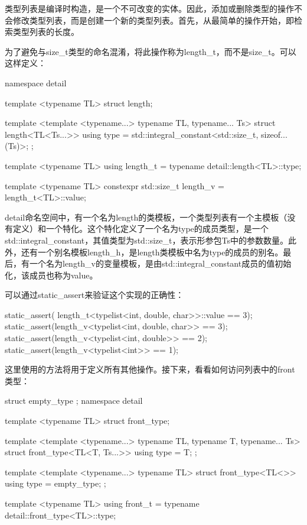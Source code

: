 类型列表是编译时构造，是一个不可改变的实体。因此，添加或删除类型的操作不会修改类型列表，而是创建一个新的类型列表。首先，从最简单的操作开始，即检索类型列表的长度。

为了避免与size_t类型的命名混淆，将此操作称为length_t，而不是size_t。可以这样定义：

\begin{cppcode}
namespace detail
{
	template <typename TL>
	struct length;
	
	template <template <typename...> typename TL,
			  typename... Ts>
	struct length<TL<Ts...>>
	{
		using type =
		std::integral_constant<std::size_t, sizeof...(Ts)>;
	};
}

template <typename TL>
using length_t = typename detail::length<TL>::type;

template <typename TL>
constexpr std::size_t length_v = length_t<TL>::value;
\end{cppcode}

detail命名空间中，有一个名为length的类模板，一个类型列表有一个主模板（没有定义）和一个特化。这个特化定义了一个名为type的成员类型，是一个std::integral_constant，其值类型为std::size_t，表示形参包Ts中的参数数量。此外，还有一个别名模板length_h，是length类模板中名为type的成员的别名。最后，有一个名为length_v的变量模板，是由std::integral_constant成员的值初始化，该成员也称为value。

可以通过static_assert来验证这个实现的正确性：

\begin{cppcode}
static_assert(
	length_t<typelist<int, double, char>>::value == 3);
static_assert(length_v<typelist<int, double, char>> == 3);
static_assert(length_v<typelist<int, double>> == 2);
static_assert(length_v<typelist<int>> == 1);
\end{cppcode}

这里使用的方法将用于定义所有其他操作。接下来，看看如何访问列表中的front类型：

\begin{cppcode}
struct empty_type {};
namespace detail
{
	template <typename TL>
	struct front_type;
	
	template <template <typename...> typename TL,
			  typename T, typename... Ts>
	struct front_type<TL<T, Ts...>>
	{
		using type = T;
	};

	template <template <typename...> typename TL>
	struct front_type<TL<>>
	{
		using type = empty_type;
	};
}

template <typename TL>
using front_t = typename detail::front_type<TL>::type;
\end{cppcode}

